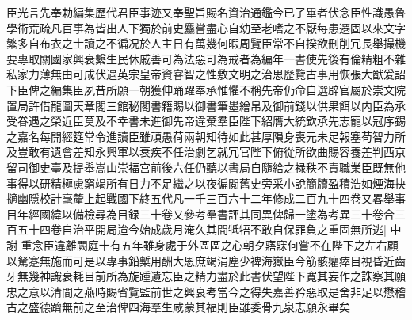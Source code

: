 臣光言先奉勅編集歷代君臣事迹又奉聖旨賜名資治通鑑今已了畢者伏念臣性識愚魯學術荒疏凡百事為皆出人下獨於前史麤嘗盡心自幼至老嗜之不厭每患遷固以來文字繁多自布衣之士讀之不徧况於人主日有萬幾何暇周覽臣常不自揆欲刪削冗長舉撮機要專取關國家興衰繫生民休戚善可為法惡可為戒者為編年一書使先後有倫精粗不雜私家力薄無由可成伏遇英宗皇帝資睿智之性敷文明之治思歷覽古事用恢張大猷爰詔下臣俾之編集臣夙昔所願一朝獲伸踊躍奉承惟懼不稱先帝仍命自選辟官屬於崇文院置局許借龍圖天章閣三館秘閣書籍賜以御書筆墨繒帛及御前錢以供果餌以内臣為承受眷遇之榮近臣莫及不幸書未進御先帝違棄羣臣陛下紹膺大統欽承先志寵以冠序錫之嘉名每開經筵常令進讀臣雖頑愚荷兩朝知待如此甚厚隕身喪元未足報塞苟智力所及豈敢有遺會差知永興軍以衰疾不任治劇乞就冗官陛下俯從所欲曲賜容養差判西京留司御史臺及提舉嵩山崇福宫前後六任仍聽以書局自隨給之禄秩不責職業臣既無他事得以研精極慮窮竭所有日力不足繼之以夜徧閲舊史旁采小說簡牘盈積浩如煙海抉擿幽隱校計毫釐上起戰國下終五代凡一千三百六十二年修成二百九十四卷又畧舉事目年經國緯以備檢尋為目録三十卷又參考羣書評其同異俾歸一塗為考異三十卷合三百五十四卷自治平開局迨今始成歲月淹久其間牴牾不敢自保罪負之重固無所逃|{
	中謝}
重念臣違離闕庭十有五年雖身處于外區區之心朝夕寤寐何嘗不在陛下之左右顧以駑蹇無施而可是以專事鉛槧用酬大恩庶竭涓塵少禆海嶽臣今筋骸癯瘁目視昏近齒牙無幾神識衰耗目前所為旋踵遺忘臣之精力盡於此書伏望陛下寛其妄作之誅察其願忠之意以清間之燕時賜省覽監前世之興衰考當今之得失嘉善矜惡取是舍非足以懋稽古之盛德躋無前之至治俾四海羣生咸蒙其福則臣雖委骨九泉志願永畢矣






















































